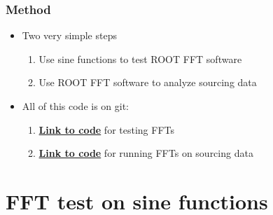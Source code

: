 \documentclass[bigger]{beamer}
\providecommand{\alert}[1]{\textbf{#1}}
\begin{document}
\begin{frame}
\frametitle{Method}
\label{sec-1-1-2}
\begin{itemize}

\item Two very simple steps
\label{sec-1-1-2-1}%
\begin{enumerate}
\item Use sine functions to test ROOT FFT software
\item Use ROOT FFT software to analyze sourcing data
\end{enumerate}

\item All of this code is on git:
\label{sec-1-1-2-2}%
\begin{enumerate}
\item \href{https://github.com/HCALPFG/HcalFFT/blob/master/FFT_tutorial.py}{\alert{Link to code}} for testing FFTs
\item \href{https://github.com/HCALPFG/HcalFFT/blob/master/FFT.py}{\alert{Link to code}} for running FFTs on sourcing data
\end{enumerate}
\end{itemize} %
\end{frame}
\section{FFT test on sine functions}
\label{sec-2}
\end{document}
